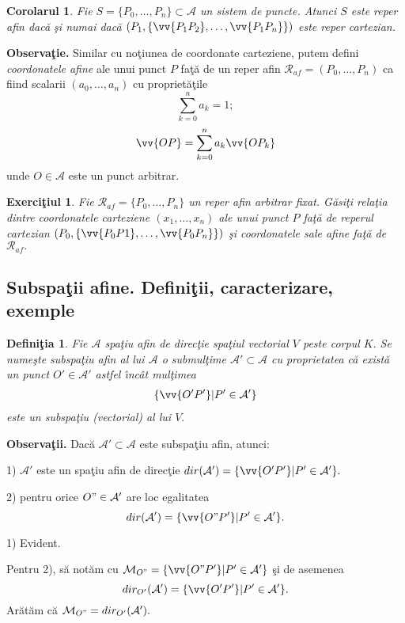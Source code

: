 \documentclass[12pt]{book}
\def\Ac{\mathcal A}
\def\Mc{\mathcal M}
\def\Rc{\mathcal R}
\def\ai{ast\-fel \^{\i}n\-c\^at }
\def\Dem{\noindent{\bf Demonstra\c tie. }}
\def\spa{spa\c tiu a\-fin }
\def\ddc{da\-c\u a \c si nu\-mai da\-c\u a }
\newtheorem{defi}{Defini\c tia }
\newtheorem{exe}{Exerci\c tiul }
\newtheorem{coro}{Corolarul }
\begin{document}
\begin{coro} Fie $S=\{P_0,\dots, P_n\}\subset \Ac$ un sistem de puncte. Atunci $S$ este reper afin \ddc
$\left(P_1, \{\vv{P_1P_2},\dots, \vv{P_1P_n}\}\right)$ este reper cartezian. 
\end{coro}


{\bf Observa\c tie.} Similar cu no\c tiunea de coordonate carteziene, putem defini {\em coordonatele afine} ale unui punct $P$ fa\c t\u a de un reper afin $\Rc_{af}=(P_0,\dots, P_n)$  ca fiind scalarii
$(a_0, \dots, a_n)$ cu propriet\u a\c tile
$$\sum_{k=0}^na_k=1;$$
$$\vv{OP}=\sum_{k=0}^na_k\vv{OP_k}$$
unde $O\in \Ac$ este un punct arbitrar.

\begin{exe}
Fie $\Rc_{af}=\{P_0,\dots, P_n\}$ un reper afin arbitrar fixat. G\u asi\c ti rela\c tia dintre coordonatele {\em carteziene} $(x_1,\dots, x_n)$ ale unui punct $P$ fa\c t\u a de reperul cartezian $\left(P_0, \{\vv{P_0P1},\dots, \vv{P_0P_n}\}\right)$ \c si coordonatele sale afine fa\c t\u a de $\Rc_{af}.$
\end{exe}





\subsection{Subspa\c tii afine. Defini\c tii, caracterizare, exemple}

\begin{defi} Fie $\Ac$ \spa de direc\c tie spa\c tiul vectorial $V$ peste corpul $K.$
Se nume\c ste {\em subspa\c tiu afin} al lui $\Ac$ o submul\c time $\Ac' \subset \Ac$ cu proprietatea c\u a exist\u a un punct $O'\in \Ac'$ \ai
mul\c timea 
\begin{eqnarray}\label{dirsb}
\{\vv{O'P'}\vert P'\in \Ac'\}
\end{eqnarray}
este un subspa\c tiu (vectorial) al lui $V.$
\end{defi}


{\bf Observa\c tii.} 
Dac\u a $\Ac'\subset \Ac$ este subspa\c tiu afin, atunci: 

1) $\Ac'$ este un spa\c tiu afin de direc\c tie $dir(\Ac')=\{\vv{O'P'}\vert P'\in \Ac'\}.$

2) pentru orice $O"\in \Ac'$ are loc egalitatea 
$$dir(\Ac')=\{\vv{O"P'}\vert P'\in \Ac'\}.$$


\Dem 1) Evident.

Pentru 2), s\u a not\u am cu $\Mc_{O"} =\{\vv{O"P'}\vert P'\in \Ac'\}$ \c si de asemenea 
$$dir_{O'}(\Ac')=\{\vv{O'P'}\vert P'\in \Ac'\}.$$
Ar\u at\u am c\u a $\Mc_{O"}=dir_{O'}(\Ac').$
\end{document}
